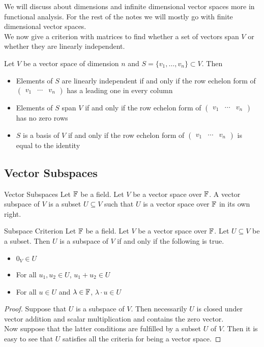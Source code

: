 \documentclass[a4paper]{article}
\begin{document}
We will discuss about dimensions and infinite dimensional vector spaces more in functional analysis. For the rest of the notes we will mostly go with finite dimensional vector spaces. \\

We now give a criterion with matrices to find whether a set of vectors span $V$ or whether they are linearly independent. 

\begin{thm}{}{} Let $V$ be a vector space of dimension $n$ and $S=\{v_1,\dots,v_n\}\subset V$. Then 
\begin{itemize}
\item Elements of $S$ are linearly independent if and only if the row echelon form of $\begin{pmatrix}v_1 & \cdots & v_n\end{pmatrix}$ has a leading one in every column
\item Elements of $S$ span $V$ if and only if the row echelon form of $\begin{pmatrix}v_1 & \cdots & v_n\end{pmatrix}$ has no zero rows
\item $S$ is a basis of $V$ if and only if the row echelon form of $\begin{pmatrix}v_1 & \cdots & v_n\end{pmatrix}$ is equal to the identity
\end{itemize}
\end{thm}

\subsection{Vector Subspaces}
\begin{defn}{Vector Subspaces}{} Let $\mathbb{F}$ be a field. Let $V$ be a vector space over $\mathbb{F}$. A vector subspace of $V$ is a subset $U\subseteq V$ such that $U$ is a vector space over $\mathbb{F}$ in its own right. 
\end{defn}

\begin{prp}{Subspace Criterion}{} Let $\mathbb{F}$ be a field. Let $V$ be a vector space over $\mathbb{F}$. Let $U\subseteq V$ be a subset. Then $U$ is a subspace of $V$ if and only if the following is true. 
\begin{itemize}
\item $0_V\in U$
\item For all $u_1,u_2\in U$, $u_1+u_2\in U$
\item For all $u\in U$ and $\lambda\in\mathbb{F}$, $\lambda\cdot u\in U$
\end{itemize} 
\begin{proof}
Suppose that $U$ is a subspace of $V$. Then necessarily $U$ is closed under vector addition and scalar multiplication and contains the zero vector. \\
Now suppose that the latter conditions are fulfilled by a subset $U$ of $V$. Then it is easy to see that $U$ satisfies all the criteria for being a vector space. 
\end{proof}
\end{prp}
\end{document}
